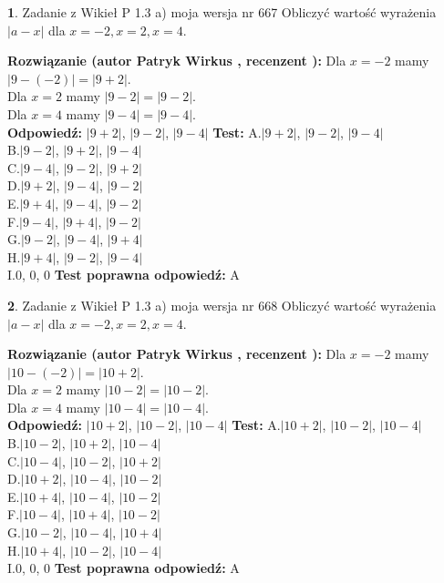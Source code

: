 \documentclass[12pt, a4paper]{article}
\theoremstyle{definition} %
\newtheorem{zad}{}
\newcommand{\zadStart}[1]{\begin{zad}#1\newline}
\newcommand{\zadStop}{\end{zad}}
\newcommand{\rozwStart}[2]{\noindent \textbf{Rozwiązanie (autor #1 , recenzent #2): }\newline}
\newcommand{\rozwStop}{\newline}
\newcommand{\odpStart}{\noindent \textbf{Odpowiedź:}\newline}
\newcommand{\odpStop}{\newline}
\newcommand{\testStart}{\noindent \textbf{Test:}\newline}
\newcommand{\testStop}{\newline}
\newcommand{\kluczStart}{\noindent \textbf{Test poprawna odpowiedź:}\newline}
\newcommand{\kluczStop}{\newline}
\begin{document}
\zadStart{Zadanie z Wikieł P 1.3 a) moja wersja nr 667}
Obliczyć wartość wyrażenia $|a - x|$ dla $x=-2,x=2,x=4$.
\zadStop
\rozwStart{Patryk Wirkus}{}
Dla $x = -2$ mamy $|9 - (-2)| = |9 + 2|$.\\
Dla $x = 2$ mamy $|9 - 2| = |9 - 2|$.\\
Dla $x = 4$ mamy $|9 - 4| = |9 - 4|$.\\
\rozwStop
\odpStart
$|9 + 2|$, $|9 - 2|$, $|9 - 4|$
\odpStop
\testStart
A.$|9 + 2|$, $|9 - 2|$, $|9 - 4|$\\
B.$|9 - 2|$, $|9 + 2|$, $|9 - 4|$\\
C.$|9 - 4|$, $|9 - 2|$, $|9 + 2|$\\
D.$|9 + 2|$, $|9 - 4|$, $|9 - 2|$\\
E.$|9 + 4|$, $|9 - 4|$, $|9 - 2|$\\
F.$|9 - 4|$, $|9 + 4|$, $|9 - 2|$\\
G.$|9 - 2|$, $|9 - 4|$, $|9 + 4|$\\
H.$|9 + 4|$, $|9 - 2|$, $|9 - 4|$\\
I.$0$, $0$, $0$
\testStop
\kluczStart
A
\kluczStop



\zadStart{Zadanie z Wikieł P 1.3 a) moja wersja nr 668}
Obliczyć wartość wyrażenia $|a - x|$ dla $x=-2,x=2,x=4$.
\zadStop
\rozwStart{Patryk Wirkus}{}
Dla $x = -2$ mamy $|10 - (-2)| = |10 + 2|$.\\
Dla $x = 2$ mamy $|10 - 2| = |10 - 2|$.\\
Dla $x = 4$ mamy $|10 - 4| = |10 - 4|$.\\
\rozwStop
\odpStart
$|10 + 2|$, $|10 - 2|$, $|10 - 4|$
\odpStop
\testStart
A.$|10 + 2|$, $|10 - 2|$, $|10 - 4|$\\
B.$|10 - 2|$, $|10 + 2|$, $|10 - 4|$\\
C.$|10 - 4|$, $|10 - 2|$, $|10 + 2|$\\
D.$|10 + 2|$, $|10 - 4|$, $|10 - 2|$\\
E.$|10 + 4|$, $|10 - 4|$, $|10 - 2|$\\
F.$|10 - 4|$, $|10 + 4|$, $|10 - 2|$\\
G.$|10 - 2|$, $|10 - 4|$, $|10 + 4|$\\
H.$|10 + 4|$, $|10 - 2|$, $|10 - 4|$\\
I.$0$, $0$, $0$
\testStop
\kluczStart
A
\kluczStop
\end{document}
